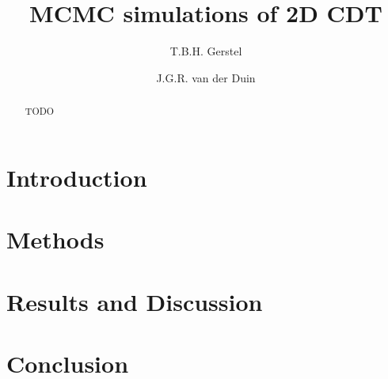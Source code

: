 \documentclass{article}
\title{MCMC simulations of 2D CDT}
\author{T.B.H. Gerstel \and J.G.R. van der Duin}
\begin{document}
\maketitle

\begin{abstract}
    TODO
\end{abstract}

\newpage

\section{Introduction}



\section{Methods}



\section{Results and Discussion}



\section{Conclusion}



\printbibliography
\end{document}
